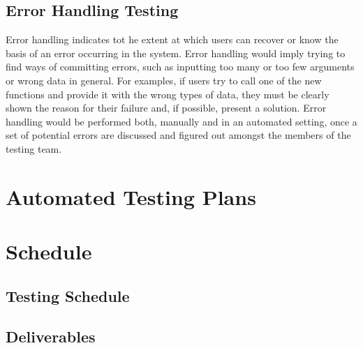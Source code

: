 \documentclass[12pt]{article}
\begin{document}
\subsection{Error Handling Testing} %
Error handling indicates tot he extent at which users can recover or know the basis of an error occurring in the system. Error handling would imply trying to find ways of committing errors, such as inputting too many or too few arguments or wrong data in general. For examples, if users try to call one of the new functions and provide it with the wrong types of data, they must be clearly shown the reason for their failure and, if possible, present a solution. Error handling would be performed both, manually and in an automated setting, once a set of potential errors are discussed and figured out amongst the members of the testing team.

\section{Automated Testing Plans} %

\section{Schedule}

\subsection{Testing Schedule} %

\subsection{Deliverables} %
\end{document}
